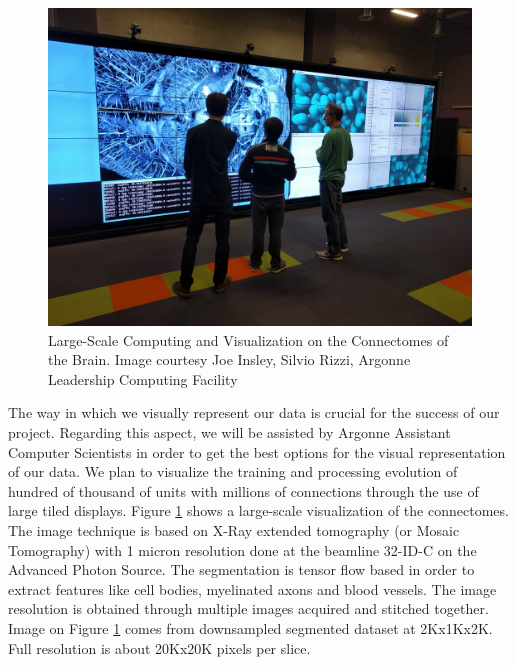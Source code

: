 \documentclass[11pt,a4paper]{article}
\begin{document}
\begin{figure}[h!]
  \includegraphics[width=\linewidth]{visualization.jpg}
  \caption{Large-Scale Computing and Visualization on the Connectomes of the Brain. %
  Image courtesy Joe Insley, Silvio Rizzi, Argonne Leadership Computing Facility}
  \label{connectome}
\end{figure}

The way in which we visually represent our data is crucial for the success of
our project.
Regarding this aspect, we will be assisted by Argonne Assistant Computer Scientists
in order to get the best options for the visual representation of our data.
We plan to visualize the training and processing evolution of hundred of thousand
of units with millions of connections through the use of large tiled displays.
Figure \ref{connectome} shows a large-scale visualization of the connectomes.
The image technique is based on X-Ray extended tomography (or Mosaic Tomography)
with 1 micron resolution done at the beamline 32-ID-C on the Advanced Photon Source.
The segmentation is tensor flow based in order to 
extract features like cell bodies, myelinated axons and blood vessels.
The image resolution is obtained through multiple images acquired
and stitched together. Image on Figure \ref{connectome} comes from
downsampled segmented dataset at 2Kx1Kx2K.
Full resolution is about 20Kx20K pixels per slice. 
\end{document}
